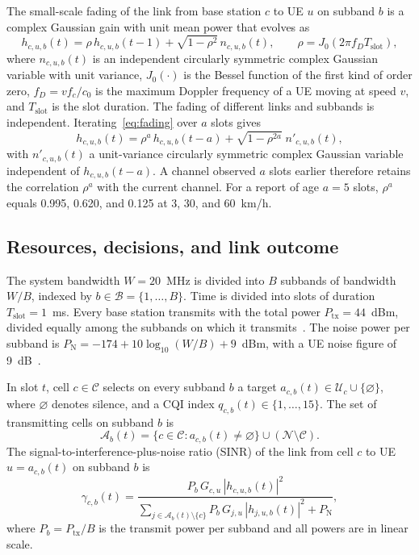 \documentclass{ieeeaccess}
\begin{document}
The small-scale fading of the link from base station $c$ to UE $u$ on subband $b$ is a complex Gaussian gain with unit mean power that evolves as
\begin{equation}
h_{c,u,b}(t) = \rho\, h_{c,u,b}(t-1) + \sqrt{1 - \rho^2}\, n_{c,u,b}(t), \qquad \rho = J_0(2 \pi f_D T_{\text{slot}}),
\label{eq:fading}
\end{equation}
where $n_{c,u,b}(t)$ is an independent circularly symmetric complex Gaussian variable with unit variance, $J_0(\cdot)$ is the Bessel function of the first kind of order zero, $f_D = v f_c / c_0$ is the maximum Doppler frequency of a UE moving at speed $v$, and $T_{\text{slot}}$ is the slot duration. The fading of different links and subbands is independent. Iterating~\eqref{eq:fading} over $a$ slots gives
\begin{equation}
h_{c,u,b}(t) = \rho^{a}\, h_{c,u,b}(t-a) + \sqrt{1 - \rho^{2a}}\; n'_{c,u,b}(t),
\label{eq:aging}
\end{equation}
with $n'_{c,u,b}(t)$ a unit-variance circularly symmetric complex Gaussian variable independent of $h_{c,u,b}(t-a)$. A channel observed $a$ slots earlier therefore retains the correlation $\rho^{a}$ with the current channel. For a report of age $a = 5$ slots, $\rho^{a}$ equals 0.995, 0.620, and 0.125 at 3, 30, and 60~km/h.

\subsection{Resources, decisions, and link outcome}
The system bandwidth $W = 20$~MHz is divided into $B$ subbands of bandwidth $W/B$, indexed by $b \in \mathcal{B} = \{1, \dots, B\}$. Time is divided into slots of duration $T_{\text{slot}} = 1$~ms. Every base station transmits with the total power $P_{\text{tx}} = 44$~dBm, divided equally among the subbands on which it transmits~\cite[Table~7.8-1]{3gpp38901}. The noise power per subband is $P_{\text{N}} = -174 + 10 \log_{10}(W/B) + 9$~dBm, with a UE noise figure of 9~dB~\cite[Table~7.8-1]{3gpp38901}.

In slot $t$, cell $c \in \mathcal{C}$ selects on every subband $b$ a target $a_{c,b}(t) \in \mathcal{U}_c \cup \{\varnothing\}$, where $\varnothing$ denotes silence, and a CQI index $q_{c,b}(t) \in \{1, \dots, 15\}$. The set of transmitting cells on subband $b$ is
\begin{equation}
\mathcal{A}_b(t) = \{ c \in \mathcal{C} : a_{c,b}(t) \ne \varnothing \} \cup (\mathcal{N} \setminus \mathcal{C}).
\label{eq:active}
\end{equation}
The signal-to-interference-plus-noise ratio (SINR) of the link from cell $c$ to UE $u = a_{c,b}(t)$ on subband $b$ is
\begin{equation}
\gamma_{c,b}(t) = \frac{P_b\, G_{c,u}\, |h_{c,u,b}(t)|^2}{\sum_{j \in \mathcal{A}_b(t) \setminus \{c\}} P_b\, G_{j,u}\, |h_{j,u,b}(t)|^2 + P_{\text{N}}},
\label{eq:sinr}
\end{equation}
where $P_b = P_{\text{tx}}/B$ is the transmit power per subband and all powers are in linear scale.
\end{document}
